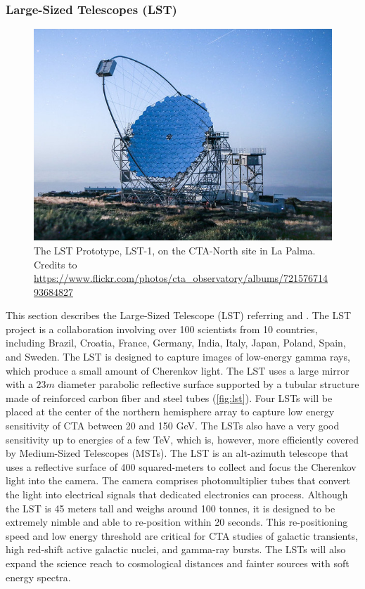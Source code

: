 \subsubsection{Large-Sized Telescopes (LST)}
\begin{figure}[t]
\centering
\includegraphics[width=0.9\linewidth]{figures/introduction/lst.jpg}
\caption{The LST Prototype, LST-1, on the CTA-North site in La Palma. Credits to \url{https://www.flickr.com/photos/cta_observatory/albums/72157671493684827}} 
\label{fig:lst}
\end{figure}
This section describes the Large-Sized Telescope (LST) referring \cite{Barrio_2020} and \cite{ctaobservatorywebsitetechnology}.
The LST project is a collaboration involving over 100 scientists from 10 countries, including Brazil, Croatia, France, Germany, India, Italy, Japan, Poland, Spain, and Sweden. The LST is designed to capture images of low-energy gamma rays, which produce a small amount of Cherenkov light. The LST uses a large mirror with a $23m$ diameter parabolic reflective surface supported by a tubular structure made of reinforced carbon fiber and steel tubes (\autoref{fig:lst}). Four LSTs will be placed at the center of the northern hemisphere array to capture low energy sensitivity of CTA between 20 and 150 GeV. The LSTs also have a very good sensitivity up to energies of a few TeV, which is, however, more efficiently covered by Medium-Sized Telescopes (MSTs). The LST is an alt-azimuth telescope that uses a reflective surface of 400 squared-meters to collect and focus the Cherenkov light into the camera. The camera comprises photomultiplier tubes that convert the light into electrical signals that dedicated electronics can process. Although the LST is 45 meters tall and weighs around 100 tonnes, it is designed to be extremely nimble and able to re-position within 20 seconds. This re-positioning speed and low energy threshold are critical for CTA studies of galactic transients, high red-shift active galactic nuclei, and gamma-ray bursts. The LSTs will also expand the science reach to cosmological distances and fainter sources with soft energy spectra. 
